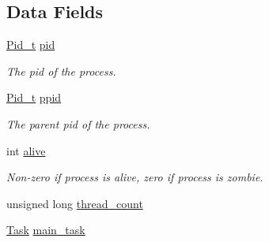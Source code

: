 \subsection*{Data Fields}
\begin{DoxyCompactItemize}
\item 
\hypertarget{structprocinfo_a2e87cd5f0bdfe214832ec20f53deeb50}{\hyperlink{group__syscalls_gafac07f3170763932fac97b6eab2c3984}{Pid\-\_\-t} \hyperlink{structprocinfo_a2e87cd5f0bdfe214832ec20f53deeb50}{pid}}\label{structprocinfo_a2e87cd5f0bdfe214832ec20f53deeb50}

\begin{DoxyCompactList}\small\item\em The pid of the process. \end{DoxyCompactList}\item 
\hyperlink{group__syscalls_gafac07f3170763932fac97b6eab2c3984}{Pid\-\_\-t} \hyperlink{structprocinfo_a790970c70987013b2712b7dd6d2b75b9}{ppid}
\begin{DoxyCompactList}\small\item\em The parent pid of the process. \end{DoxyCompactList}\item 
\hypertarget{structprocinfo_a999dc5dbfee9902a9ea458944499efd3}{int \hyperlink{structprocinfo_a999dc5dbfee9902a9ea458944499efd3}{alive}}\label{structprocinfo_a999dc5dbfee9902a9ea458944499efd3}

\begin{DoxyCompactList}\small\item\em Non-\/zero if process is alive, zero if process is zombie. \end{DoxyCompactList}\item 
unsigned long \hyperlink{structprocinfo_ae1ed3afa8904729a1daf1b51780cf2cf}{thread\-\_\-count}
\item 
\hypertarget{structprocinfo_a4da339065f8780b37ab788f18ef9ed20}{\hyperlink{group__syscalls_ga0c7678964128d7fccc9ce98528494f4a}{Task} \hyperlink{structprocinfo_a4da339065f8780b37ab788f18ef9ed20}{main\-\_\-task}}\label{structprocinfo_a4da339065f8780b37ab788f18ef9ed20}


\end{DoxyCompactItemize}
